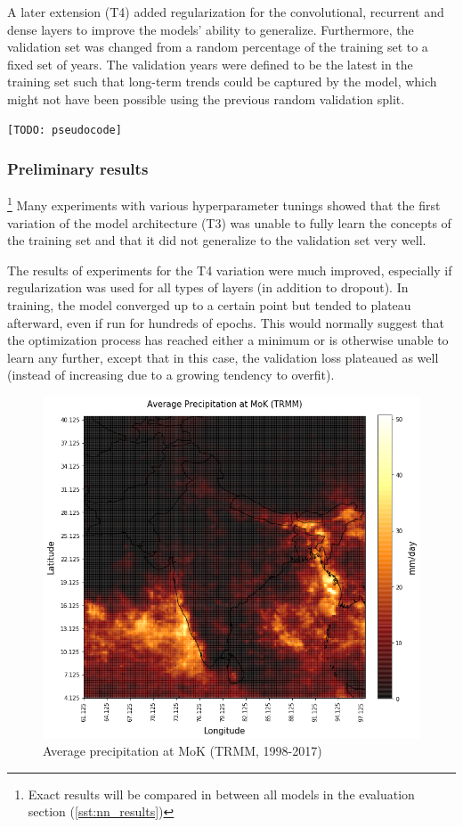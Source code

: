 A later extension (T4) added regularization for the convolutional, recurrent and dense layers to improve the models' ability to generalize. Furthermore, the validation set was changed from a random percentage of the training set to a fixed set of years. The validation years were defined to be the latest in the training set such that long-term trends could be captured by the model, which might not have been possible using the previous random validation split.

\begin{figure}[h]
\end{figure}

\begin{lstlisting}[language=Python]
  [TODO: pseudocode]
\end{lstlisting}

\subsubsection{Preliminary results}{\footnote{Exact results will be compared in between all models in the evaluation section (\cref{sst:nn_results})}}
\label{ssst:nn_t3_results}
Many experiments with various hyperparameter tunings showed that the first variation of the model architecture (T3) was unable to fully learn the concepts of the training set and that it did not generalize to the validation set very well.

The results of experiments for the T4 variation were much improved, especially if regularization was used for all types of layers (in addition to dropout). In training, the model converged up to a certain point but tended to plateau afterward, even if run for hundreds of epochs. This would normally suggest that the optimization process has reached either a minimum or is otherwise unable to learn any further, except that in this case, the validation loss plateaued as well (instead of increasing due to a growing tendency to overfit).

\begin{figure}[h]
  \centering
  \includegraphics[width=0.4\linewidth]{./99_appendix/img/prec_avg_onset}
  \caption{Average precipitation at MoK (TRMM, 1998-2017)}
  \label{fig:trmm_prec_onset}
\end{figure}

